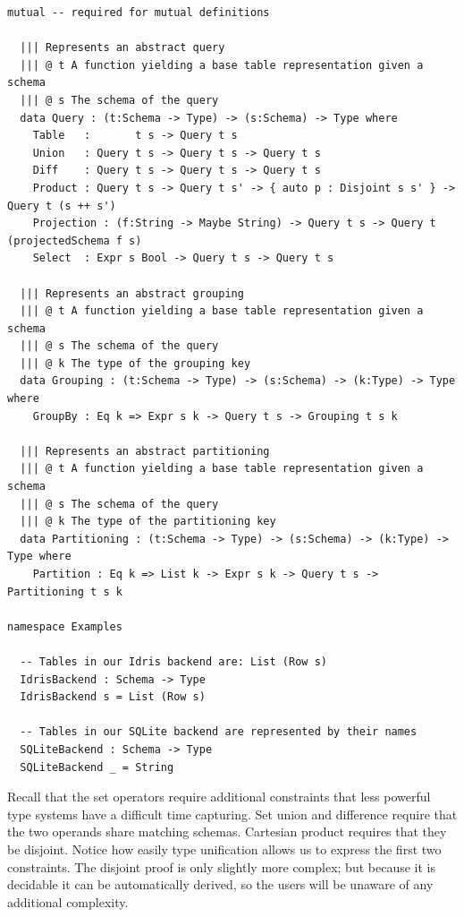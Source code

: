 \documentclass[12pt]{article}
\begin{document}
\begin{lstlisting}[caption={Representing queries},label={lst:queries}]
mutual -- required for mutual definitions

  ||| Represents an abstract query
  ||| @ t A function yielding a base table representation given a schema
  ||| @ s The schema of the query
  data Query : (t:Schema -> Type) -> (s:Schema) -> Type where
    Table   :       t s -> Query t s
    Union   : Query t s -> Query t s -> Query t s
    Diff    : Query t s -> Query t s -> Query t s
    Product : Query t s -> Query t s' -> { auto p : Disjoint s s' } -> Query t (s ++ s')
    Projection : (f:String -> Maybe String) -> Query t s -> Query t (projectedSchema f s)
    Select  : Expr s Bool -> Query t s -> Query t s

  ||| Represents an abstract grouping
  ||| @ t A function yielding a base table representation given a schema
  ||| @ s The schema of the query
  ||| @ k The type of the grouping key
  data Grouping : (t:Schema -> Type) -> (s:Schema) -> (k:Type) -> Type where
    GroupBy : Eq k => Expr s k -> Query t s -> Grouping t s k

  ||| Represents an abstract partitioning
  ||| @ t A function yielding a base table representation given a schema
  ||| @ s The schema of the query
  ||| @ k The type of the partitioning key
  data Partitioning : (t:Schema -> Type) -> (s:Schema) -> (k:Type) -> Type where
    Partition : Eq k => List k -> Expr s k -> Query t s -> Partitioning t s k

namespace Examples

  -- Tables in our Idris backend are: List (Row s)
  IdrisBackend : Schema -> Type
  IdrisBackend s = List (Row s)

  -- Tables in our SQLite backend are represented by their names
  SQLiteBackend : Schema -> Type
  SQLiteBackend _ = String
\end{lstlisting}

Recall that the set operators require additional constraints that less powerful type systems have a difficult time capturing.
Set union and difference require that the two operands share matching schemas.
Cartesian product requires that they be disjoint.
Notice how easily type unification allows us to express the first two constraints.
The disjoint proof is only slightly more complex; but because it is decidable it can be automatically derived, so the users will be unaware of any additional complexity.

\end{document}
